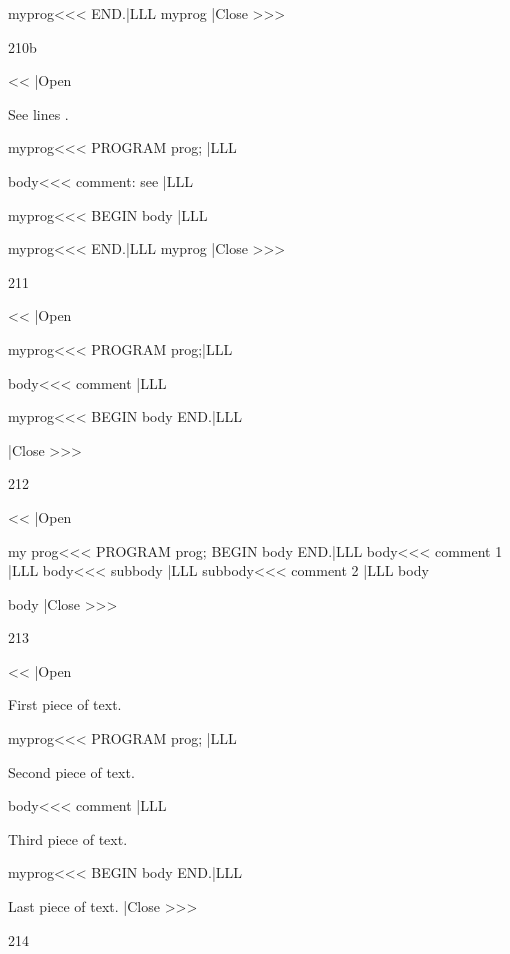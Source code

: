 {\ResetLineCount 
\<myprog\><<<
END.|LLL \OutputCode\<myprog\> 
|Close >>> 

2{10b}


\<<<
|Open
\def\CodeRef[#1]{\Ref{#1}}
\def\CodeTag[#1][#2]{%
              \Tag{#1}{#2}}

See lines \Ref{*}.

\<myprog\><<<
PROGRAM prog;\CodeTag[*][1]|LLL

\<body\><<<
{comment: see \CodeRef[*]}|LLL

\<myprog\><<<
BEGIN         
  \<body\>   \CodeTag[*][2]|LLL

\ResetLineCount {} 
\<myprog\><<<
END.|LLL \OutputCode\<myprog\> 
|Close >>>




2{11}

\<<<
|Open   

\<myprog\><<<
PROGRAM prog;|LLL

\<body\><<<
{ comment } |LLL 
\SecIndex{***} 

\<myprog\><<<
BEGIN 
  \<body\>
END.|LLL      

\def\BeforeIndex{Index} 
\ShowIndex   
|Close >>>


 2{12}

\<<<
|Open   

\<my prog\><<<
PROGRAM prog;
BEGIN  \<body\>
END.|LLL
\<body\><<<
{ comment 1} 
|LLL
\<body\><<<
\<subbody\> 
|LLL        
\<subbody\><<<
{ comment 2 } |LLL
\ShowTop\<body\> 

\def\ShowSep{(* ***** *)\par} 
\ShowTop\<body\>    
|Close >>> 

 2{13}


\<<<
|Open

First piece of text.

\<myprog\><<<
PROGRAM prog; |LLL

\ShowOff Second piece of text.

\<body\><<<
{ comment } |LLL

\Note  Third piece of 
text. \EndNote\ShowOn

\<myprog\><<<
BEGIN
  \<body\>
END.|LLL

Last piece of text.  
|Close >>> 

 2{14}

}
